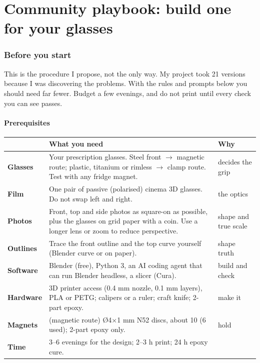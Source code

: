 \documentclass[10pt,a4paper,oneside]{article}
\begin{document}
\clearpage\part{Community playbook: build one for your glasses}

\section{Before you start}
\begin{keyidea}
This is the procedure I propose, not the only way. My project took 21 versions because I was discovering the problems. With the rules and prompts
below you should need far fewer. Budget a few evenings, and do not print until every check you can see passes.
\end{keyidea}

\subsection{Prerequisites}
\begin{center}\small
\begin{tabularx}{\linewidth}{@{}>{\sffamily\bfseries}p{2.6cm}X>{\raggedright\arraybackslash}p{3.6cm}@{}}
\toprule
 & What you need & Why \\ \midrule
Glasses & Your prescription glasses. Steel front $\to$ magnetic route; plastic, titanium or rimless $\to$ clamp route. Test with any fridge magnet. & decides the grip \\
Film & One pair of passive (polarised) cinema 3D glasses. Do not swap left and right. & the optics \\
Photos & Front, top and side photos as square-on as possible, plus the glasses on grid paper with a coin. Use a longer lens or zoom to reduce perspective. & shape and true scale \\
Outlines & Trace the front outline and the top curve yourself (Blender curve or on paper). & shape truth \\
Software & Blender (free), Python 3, an AI coding agent that can run Blender headless, a slicer (Cura). & build and check \\
Hardware & 3D printer access (0.4 mm nozzle, 0.1 mm layers), PLA or PETG; calipers or a ruler; craft knife; 2-part epoxy. & make it \\
Magnets & (magnetic route) \O4$\times$1 mm N52 discs, about 10 (6 used); 2-part epoxy only. & hold \\
Time & 3--6 evenings for the design; 2--3 h print; 24 h epoxy cure. & \\ \bottomrule
\end{tabularx}\end{center}
\end{document}
